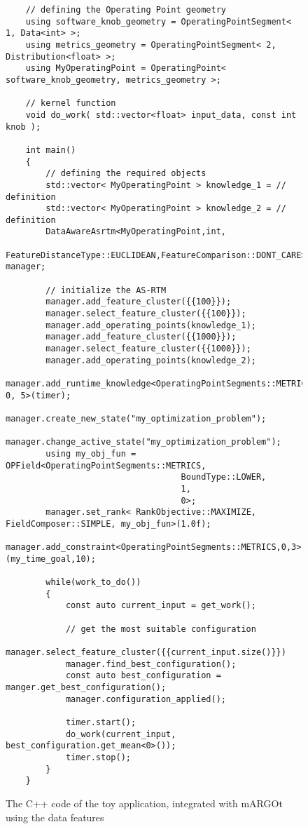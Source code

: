\begin{figure}[!t]
	\centering
	\lstset{language=MyCPP}
	\begin{lstlisting}
	// defining the Operating Point geometry
	using software_knob_geometry = OperatingPointSegment< 1, Data<int> >;
	using metrics_geometry = OperatingPointSegment< 2, Distribution<float> >;
	using MyOperatingPoint = OperatingPoint< software_knob_geometry, metrics_geometry >;
	
	// kernel function
	void do_work( std::vector<float> input_data, const int knob );
	
	int main()
	{
		// defining the required objects
		std::vector< MyOperatingPoint > knowledge_1 = // definition
		std::vector< MyOperatingPoint > knowledge_2 = // definition
		DataAwareAsrtm<MyOperatingPoint,int,
		               FeatureDistanceType::EUCLIDEAN,FeatureComparison::DONT_CARE> manager;
		
		// initialize the AS-RTM
		manager.add_feature_cluster({{100}});
		manager.select_feature_cluster({{100}});
		manager.add_operating_points(knowledge_1);
		manager.add_feature_cluster({{1000}});
		manager.select_feature_cluster({{1000}});
		manager.add_operating_points(knowledge_2);
		manager.add_runtime_knowledge<OperatingPointSegments::METRICS, 0, 5>(timer);
		manager.create_new_state("my_optimization_problem");
		manager.change_active_state("my_optimization_problem");
		using my_obj_fun = OPField<OperatingPointSegments::METRICS,
		                           BoundType::LOWER,
	 	                           1,
	                               0>;
		manager.set_rank< RankObjective::MAXIMIZE, FieldComposer::SIMPLE, my_obj_fun>(1.0f);
		manager.add_constraint<OperatingPointSegments::METRICS,0,3>(my_time_goal,10);
		
		while(work_to_do())
		{
			const auto current_input = get_work();
			
			// get the most suitable configuration
			manager.select_feature_cluster({{current_input.size()}})
			manager.find_best_configuration();
			const auto best_configuration = manger.get_best_configuration();
			manager.configuration_applied();
			
			timer.start();
			do_work(current_input, best_configuration.get_mean<0>());
			timer.stop();
		}
	}
	\end{lstlisting}
	\caption{The C++ code of the toy application, integrated with mARGOt using the data features}
	\label{fig:toy_application_integration_complex}
\end{figure}

